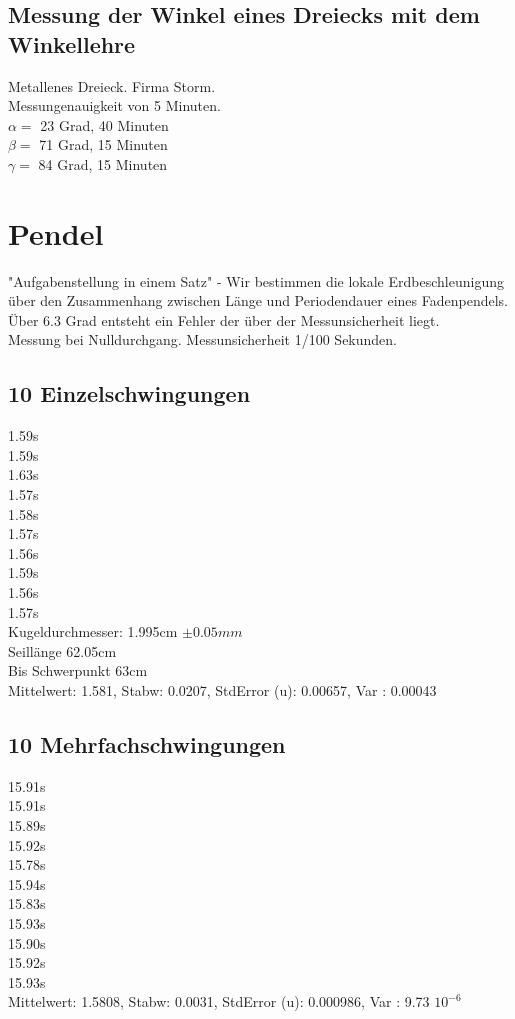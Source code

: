 \documentclass[12pt,a4paper]{article}
\begin{document}
\begin{multicols}{2}
\subsection{Messung der Winkel eines Dreiecks mit dem Winkellehre}

Metallenes Dreieck. Firma Storm.\\
Messungenauigkeit von 5 Minuten.\\
$\alpha = $ 23 Grad, 40 Minuten\\
$\beta =$ 71 Grad, 15 Minuten\\
$\gamma = $ 84 Grad, 15 Minuten\\

\section{Pendel}
"Aufgabenstellung in einem Satz" - Wir bestimmen die lokale Erdbeschleunigung über den Zusammenhang zwischen Länge und Periodendauer eines Fadenpendels.\\

Über 6.3 Grad entsteht ein Fehler der über der Messunsicherheit liegt. \\
Messung bei Nulldurchgang.
Messunsicherheit 1/100 Sekunden.

\subsection{10 Einzelschwingungen}
1.59s\\
1.59s\\
1.63s\\
1.57s\\
1.58s\\
1.57s\\
1.56s\\
1.59s\\
1.56s\\
1.57s\\
Kugeldurchmesser: 1.995cm $\pm 0.05mm$\\
Seillänge 62.05cm\\
Bis Schwerpunkt 63cm\\
Mittelwert: 1.581, Stabw: 0.0207, StdError (u): 0.00657, Var : 0.00043
\subsection{10 Mehrfachschwingungen}
15.91s\\
15.91s\\
15.89s\\
15.92s\\
15.78s\\
15.94s\\
15.83s\\
15.93s\\
15.90s\\
15.92s\\
15.93s\\
Mittelwert: 1.5808, Stabw: 0.0031, StdError (u): 0.000986, Var : 9.73 $10^{-6}$

\end{multicols}
\end{document}
